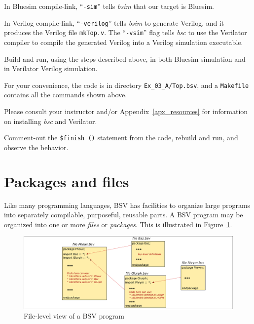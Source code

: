 In Bluesim compile-link, ``\verb|-sim|'' tells \emph{bsim} that our
target is Bluesim.

In Verilog compile-link, ``\verb|-verilog|'' tells \emph{bsim} to
generate Verilog, and it produces the Verilog file \verb|mkTop.v|.
The ``\verb|-vsim|'' flag tells \emph{bsc} to use the Verilator
compiler to compile the generated Verilog into a Verilog simulation
executable.

\Beginexercise

\Exercise

Build-and-run, using the steps described above, in both Bluesim
simulation and in Verilator Verilog simulation.

For your convenience, the code is in directory \verb|Ex_03_A/Top.bsv|,
and a \verb|Makefile| contains all the commands shown above.

Please consult your instructor and/or Appendix~\ref{apx_resources} for
information on installing \emph{bsc} and Verilator.

\Exercise

Comment-out the \verb|$finish ()| statement from the code, rebuild and
run, and observe the behavior.

\Endexercise


\section{Packages and files}


Like many programming languages, BSV has facilities to organize large
programs into separately compilable, purposeful, reusable parts.  A
BSV program may be organized into one or more \emph{files} or
\emph{packages}.  This is illustrated in
Figure~\ref{Fig_BSV_program_structure}.
\begin{figure}[htbp]
  \centerline{\includegraphics[width=6in,angle=0]{Figures/Fig_BSV_program_structure}}
  \caption{\label{Fig_BSV_program_structure}
           File-level view of a BSV program}
\end{figure}

